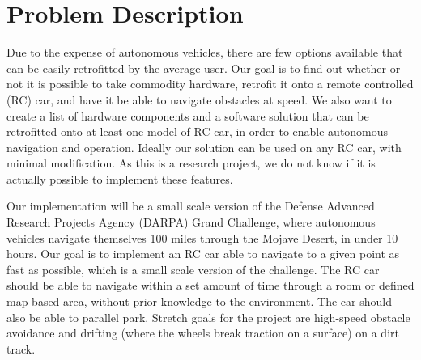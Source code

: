\documentclass[draftclsnofoot,onecolumn,10pt]{IEEEtran}
\begin{document}
\section{Problem Description}
Due to the expense of autonomous vehicles, there are few options available that can be easily retrofitted by the average user. 
Our goal is to find out whether or not it is possible to take commodity hardware, retrofit it onto a remote controlled (RC) car, and have it be able to navigate obstacles at speed. 
We also want to create a list of hardware components and a software solution that can be retrofitted onto at least one model of RC car, in order to enable autonomous navigation and operation. 
Ideally our solution can be used on any RC car, with minimal modification. 
As this is a research project, we do not know if it is actually possible to implement these features.\par
Our implementation will be a small scale version of the Defense Advanced Research Projects Agency (DARPA) Grand Challenge, where autonomous vehicles navigate themselves 100 miles through the Mojave Desert, in under 10 hours. 
Our goal is to implement an RC car able to navigate to a given point as fast as possible, which is a small scale version of the challenge. 
The RC car should be able to navigate within a set amount of time through a room or defined map based area, without prior knowledge to the environment.
The car should also be able to parallel park. 
Stretch goals for the project are high-speed obstacle avoidance and drifting (where the wheels break traction on a surface) on a dirt track.
\end{document}
